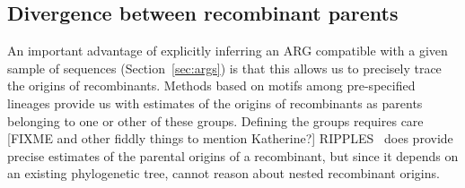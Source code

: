 \documentclass{article}
\begin{document}

\subsection{Divergence between recombinant parents}
\label{sec:parent_divergence}
An important advantage of explicitly inferring an ARG compatible
with a given sample of sequences (Section~\ref{sec:args}) 
is that this allows us to precisely trace the origins of recombinants.
Methods based on motifs among pre-specified lineages
provide us with estimates of the origins of recombinants as
parents belonging to one or other of these groups. Defining the
groups requires care [FIXME and other fiddly things to mention Katherine?]
RIPPLES~\citep{Turakhia2022-it} does provide precise estimates
of the parental origins of a recombinant, but since it depends
on an existing phylogenetic tree, cannot reason about
nested recombinant origins.
\end{document}
